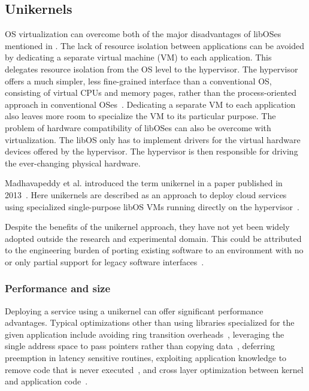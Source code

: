 \documentclass[10pt,twocolumn,a4paper]{article}
\begin{document}
  \subsection{Unikernels}
    OS virtualization can overcome both of the major disadvantages of libOSes
    mentioned in .
    The lack of resource isolation between applications can be avoided by
    dedicating a separate virtual machine (VM) to each application.
    This delegates resource isolation from the OS level to the hypervisor.
    The hypervisor offers a much simpler, less fine-grained interface than
    a conventional OS, consisting of virtual CPUs and memory pages, 
    rather than the process-oriented approach in conventional OSes~\cite{madhavapeddy13-2}.
    Dedicating a separate VM to each application also leaves more room
    to specialize the VM to its particular purpose.
    The problem of hardware compatibility of libOSes can also be overcome
    with virtualization. The libOS only has to implement drivers for
    the virtual hardware devices offered by the hypervisor.
    The hypervisor is then responsible for driving the ever-changing physical
    hardware.

    Madhavapeddy et al. introduced the term unikernel in a paper 
    published in 2013~\cite{madhavapeddy13}.
    Here unikernels are described as an approach to deploy cloud services
    using specialized single-purpose libOS VMs running directly 
    on the hypervisor~\cite{madhavapeddy13}.

    Despite the benefits of the unikernel approach, they have not yet been widely adopted
    outside the research and experimental domain.
    This could be attributed to the engineering burden of porting existing software
    to an environment with no or only partial support for legacy software interfaces~\cite{raza19}.
    
    \subsubsection{Performance and size}
      Deploying a service using a unikernel can offer significant
      performance advantages.
      Typical optimizations other than using libraries specialized for the given
      application include avoiding ring transition overheads~\cite{maeda2003},
      leveraging the single address space to pass pointers rather than copying data~\cite {schatzberg16},
      deferring preemption in latency sensitive routines,
      exploiting application knowledge to remove code that is never executed~\cite{madhavapeddy13},
      and cross layer optimization between kernel and application code~\cite{raza19}.
\end{document}
